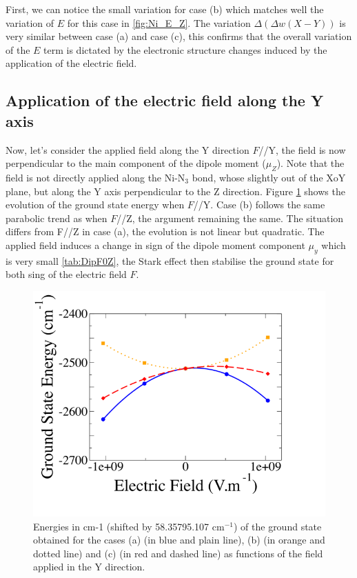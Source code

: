 \documentclass[10pt]{report}
\numberwithin{equation}{section}
\begin{document}
First, we can notice the small variation for case (b) which matches well the variation of $E$ for this case in \ref{fig:Ni_E_Z}.
The variation $\Delta (\Delta w(X-Y))$ is very similar between case (a) and case (c), this confirms that the overall variation of the $E$ term is dictated by the electronic structure changes induced by the application of the electric field.


\subsection{Application of the electric field along the Y axis}

Now, let's consider the applied field along the Y direction $F$//Y, the field is now perpendicular to the main component of the dipole moment ($\mu_Z$).
Note that the field is not directly applied along the Ni-N$_3$ bond, whose slightly out of the XoY plane, but along the Y axis perpendicular to the Z direction.
Figure \ref{GSE_Y} shows the evolution of the ground state energy when $F$//Y.
Case (b) follows the same parabolic trend as when $F$//Z, the argument remaining the same.
The situation differs from F//Z in case (a), the evolution is not linear but quadratic. 
The applied field induces a change in sign of the dipole moment component $\mu_y$ which is very small \ref{tab:DipF0Z}, the Stark effect then stabilise the ground state for both sing of the electric field $F$.


\begin{figure}[!h]
    \centering
    \includegraphics[width=\textwidth]{Images/E_Y.png}
    \caption{Energies in cm-1 (shifted by 58.35795.107 cm$^{-1}$) of the ground state obtained for the cases (a) (in blue and plain line), (b)
    (in orange and dotted line) and (c) (in red and dashed line) as functions of the field applied in the Y direction.}
    \label{GSE_Y}
\end{figure}
\end{document}
